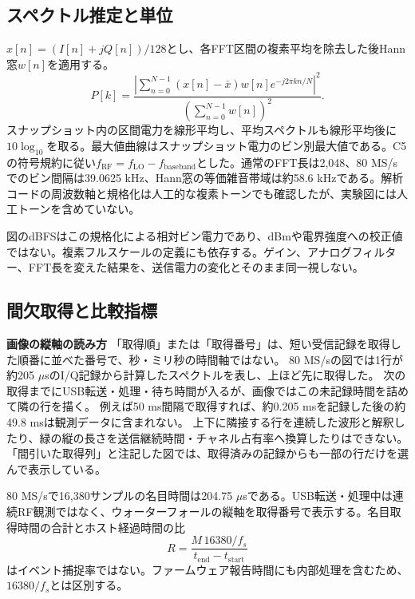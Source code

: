 \documentclass[a4paper,10pt]{ltjsarticle}
\begin{document}
\subsection{スペクトル推定と単位}
$x[n]=(I[n]+jQ[n])/128$とし、各FFT区間の複素平均を除去した後Hann窓$w[n]$を適用する。
\begin{equation}
P[k]=\frac{\left|\sum_{n=0}^{N-1}(x[n]-\bar x)w[n]e^{-j2\pi kn/N}\right|^2}{(\sum_{n=0}^{N-1}w[n])^2}.
\end{equation}
スナップショット内の区間電力を線形平均し、平均スペクトルも線形平均後に$10\log_{10}$を取る。最大値曲線はスナップショット電力のビン別最大値である。C5の符号規約に従い$f_{\mathrm{RF}}=f_{\mathrm{LO}}-f_{\mathrm{baseband}}$とした。通常のFFT長は2,048、80 MS/sでのビン間隔は39.0625 kHz、Hann窓の等価雑音帯域は約58.6 kHzである。解析コードの周波数軸と規格化は人工的な複素トーンでも確認したが、実験図には人工トーンを含めていない。

図のdBFSはこの規格化による相対ビン電力であり、dBmや電界強度への校正値ではない。複素フルスケールの定義にも依存する。ゲイン、アナログフィルター、FFT長を変えた結果を、送信電力の変化とそのまま同一視しない。

\subsection{間欠取得と比較指標}
\label{sec:intermittent}

\noindent\textbf{画像の縦軸の読み方}\quad
「取得順」または「取得番号」は、短い受信記録を取得した順番に並べた番号で、秒・ミリ秒の時間軸ではない。
80 MS/sの図では1行が約205 $\mu$sのI/Q記録から計算したスペクトルを表し、上ほど先に取得した。
次の取得までにUSB転送・処理・待ち時間が入るが、画像ではこの未記録時間を詰めて隣の行を描く。
例えば50 ms間隔で取得すれば、約0.205 msを記録した後の約49.8 msは観測データに含まれない。
上下に隣接する行を連続した波形と解釈したり、緑の縦の長さを送信継続時間・チャネル占有率へ換算したりはできない。
「間引いた取得列」と注記した図では、取得済みの記録からも一部の行だけを選んで表示している。

80 MS/sで16,380サンプルの名目時間は204.75 $\mu$sである。USB転送・処理中は連続RF観測ではなく、ウォーターフォールの縦軸を取得番号で表示する。名目取得時間の合計とホスト経過時間の比
\begin{equation}R=\frac{M\,16380/f_s}{t_{\mathrm{end}}-t_{\mathrm{start}}}\end{equation}
はイベント捕捉率ではない。ファームウェア報告時間にも内部処理を含むため、$16380/f_s$とは区別する。
\end{document}
